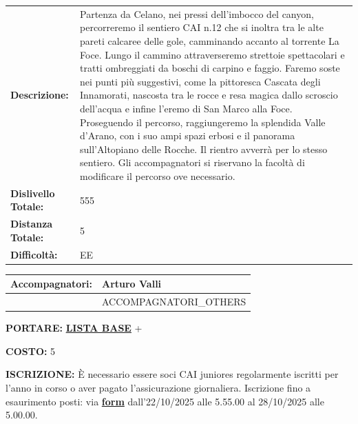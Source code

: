 \documentclass[12pt]{article}
\begin{document}
\noindent
{\small
\begin{tabular}{|p{3.5cm}|p{\dimexpr\textwidth-3.5cm-4\tabcolsep-3\arrayrulewidth\relax}|}
\hline
\rowcolor{celeste}\multicolumn{2}{|l|}{\textbf{PROGRAMMA: Gole Celano}} \\
\hline
\textbf{Descrizione:} & 
{\footnotesize Partenza da Celano, nei pressi dell’imbocco del canyon, percorreremo il sentiero CAI n.12 che si inoltra tra le alte pareti calcaree delle gole, camminando accanto al torrente La Foce. Lungo il cammino attraverseremo strettoie spettacolari e tratti ombreggiati da boschi di carpino e faggio. Faremo soste nei punti più suggestivi, come la pittoresca Cascata degli Innamorati, nascosta tra le rocce e resa magica dallo scroscio dell’acqua e infine l’eremo di San Marco alla Foce. Proseguendo il percorso, raggiungeremo la splendida Valle d’Arano, con i suo ampi spazi erbosi e il panorama sull’Altopiano delle Rocche. Il rientro avverrà per lo stesso sentiero. Gli accompagnatori si riservano la facoltà di modificare il percorso ove necessario.} \\
\hline
\textbf{Dislivello Totale:} & 555 \\
\hline
\textbf{Distanza Totale:} & 5 \\
\hline
\textbf{Difficoltà:} & EE \\
\hline
\end{tabular}
}

\vspace{0.3cm}

\noindent
{\small
\begin{tabular}{|p{3.5cm}|p{\dimexpr\textwidth-3.5cm-4\tabcolsep-3\arrayrulewidth\relax}|}
\hline
\rowcolor{celeste}\textbf{Accompagnatori:} & \cellcolor{arancione}Arturo Valli \\ 
\hline
 & {{ACCOMPAGNATORI_OTHERS}} \\ 
\hline
\end{tabular}
}

\vspace{0.3cm}

\noindent
{\small
\textbf{PORTARE:} \href{https://www.cairoma.it/?page_id=22206}{\textbf{LISTA BASE}} + 

\vspace{0.2cm}
\noindent
\textbf{COSTO:} 5

\vspace{0.2cm}
\noindent
\textbf{ISCRIZIONE:} È necessario essere soci CAI juniores regolarmente iscritti per l'anno in corso o aver pagato l'assicurazione giornaliera.
Iscrizione fino a esaurimento posti: via \href{}{\textbf{form}} dall'22/10/2025 alle 5.55.00 al 28/10/2025 alle 5.00.00.
}
\end{document}
